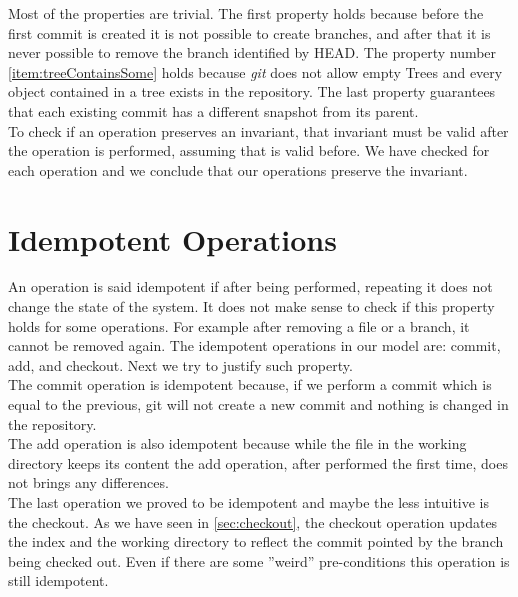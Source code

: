 Most of the properties are trivial. The first property holds
because before the first commit is created it is not possible to
create branches, and after that it is never possible to remove the branch
identified by HEAD. The property number 
\ref{item:treeContainsSome} holds because
\emph{git} does not allow empty Trees and every object contained in a
tree exists in the repository. The last property guarantees
that each existing commit has a different snapshot from its parent.\\

To check if an operation preserves an invariant, that invariant must
be valid after the operation is performed, assuming that is valid
before. We have checked for each operation and
we conclude that our operations preserve the invariant.


\section{Idempotent Operations}
An operation is said idempotent if after being performed, repeating it
does not change the state of the system. It does not make sense to
check if this property holds for some operations. For example after
removing a file or a branch, it cannot be removed again. The
idempotent operations in our model are: commit, add, and checkout.
Next we try to justify such property.\\

The commit operation is idempotent because, if we perform a commit which 
is equal to the previous, git will not create a new commit and nothing 
is changed in the repository.\\

The add operation is also idempotent because while the file in the
working directory keeps its content the add operation, after performed
the first time, does not brings any differences.\\

The last operation we proved to be idempotent and maybe the less
intuitive is the checkout. As we have seen in
\ref{sec:checkout}, the checkout operation updates the index and
the working directory to reflect the commit pointed by the branch being
checked out. Even if there are some ''weird'' pre-conditions this
operation is still idempotent.

